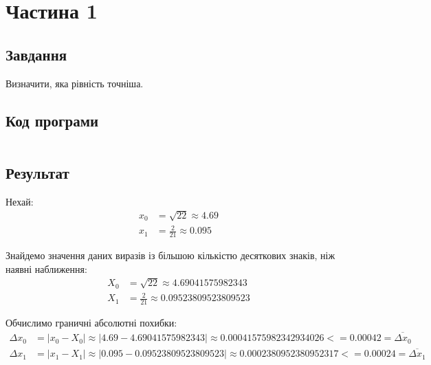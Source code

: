 \section{Частина 1}
\label{sec:task1}

\subsection{Завдання}
\label{subsec:task1_task}

Визначити, яка рівність точніша.

\subsection{Код програми}
\label{subsec:task1_code}
\inputminted{python}{../src/task1.py}

\subsection{Результат}
\label{subsec:task1_result}

Нехай:
\begin{align}
    x_0 & =
    \sqrt{22}
    \approx 4.69
    \label{eq:x0_original} \\
    x_1 & =
    \frac{2}{21}
    \approx 0.095
    \label{eq:x1_original}
\end{align}

Знайдемо значення даних виразів із більшою кількістю
десяткових знаків, ніж наявні наближення:
\begin{align}
    X_0 & =
    \sqrt{22}
    \approx 4.69041575982343
    \label{eq:x0_expected} \\
    X_1 & =
    \frac{2}{21}
    \approx 0.09523809523809523
    \label{eq:x1_expected}
\end{align}

Обчислимо граничні абсолютні похибки:
\begin{align}
    \Delta x_0 & =
    |\hyperref[eq:x0_original]{x_0} - \hyperref[eq:x0_expected]{X_0}|
    \approx |4.69 - 4.69041575982343|
    \approx 0.00041575982342934026 <= 0.00042
    = \overline{\Delta x_0}
    \label{eq:x0_absolute_rounding_error} \\
    \Delta x_1 & =
    |\hyperref[eq:x1_original]{x_1} - \hyperref[eq:x1_expected]{X_1}|
    \approx |0.095 - 0.09523809523809523|
    \approx 0.0002380952380952317 <= 0.00024
    = \overline{\Delta x_1}
    \label{eq:x1_absolute_rounding_error}
\end{align}

